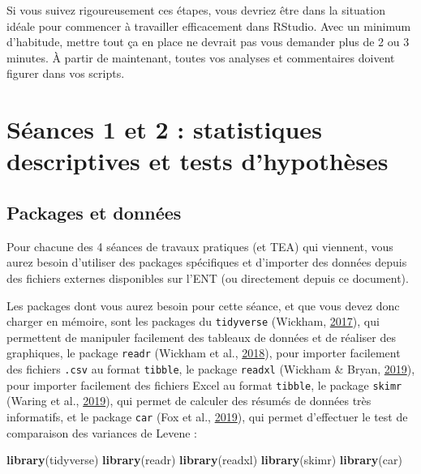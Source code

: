 \documentclass[a4paperpaper,]{article}
\newenvironment{Shaded}{\begin{snugshade}}{\end{snugshade}}
\newcommand{\KeywordTok}[1]{\textcolor[rgb]{0.12,0.11,0.11}{\textbf{#1}}}
\newcommand{\NormalTok}[1]{\textcolor[rgb]{0.12,0.11,0.11}{#1}}
\begin{document}
Si vous suivez rigoureusement ces étapes, vous devriez être dans la situation idéale pour commencer à travailler efficacement dans RStudio. Avec un minimum d'habitude, mettre tout ça en place ne devrait pas vous demander plus de 2 ou 3 minutes. À partir de maintenant, toutes vos analyses et commentaires doivent figurer dans vos scripts.

\hypertarget{seance1}{%
\section{Séances 1 et 2 : statistiques descriptives et tests d'hypothèses}\label{seance1}}

\hypertarget{packages}{%
\subsection{Packages et données}\label{packages}}

Pour chacune des 4 séances de travaux pratiques (et TEA) qui viennent, vous aurez besoin d'utiliser des packages spécifiques et d'importer des données depuis des fichiers externes disponibles sur l'ENT (ou directement depuis ce document).

Les packages dont vous aurez besoin pour cette séance, et que vous devez donc charger en mémoire, sont les packages du \texttt{tidyverse} (Wickham, \protect\hyperlink{ref-R-tidyverse}{2017}), qui permettent de manipuler facilement des tableaux de données et de réaliser des graphiques, le package \texttt{readr} (Wickham et al., \protect\hyperlink{ref-R-readr}{2018}), pour importer facilement des fichiers \texttt{.csv} au format \texttt{tibble}, le package \texttt{readxl} (Wickham \& Bryan, \protect\hyperlink{ref-R-readxl}{2019}), pour importer facilement des fichiers Excel au format \texttt{tibble}, le package \texttt{skimr} (Waring et al., \protect\hyperlink{ref-R-skimr}{2019}), qui permet de calculer des résumés de données très informatifs, et le package \texttt{car} (Fox et al., \protect\hyperlink{ref-R-car}{2019}), qui permet d'effectuer le test de comparaison des variances de Levene :

\begin{Shaded}
\begin{Highlighting}[]
\KeywordTok{library}\NormalTok{(tidyverse)}
\KeywordTok{library}\NormalTok{(readr)}
\KeywordTok{library}\NormalTok{(readxl)}
\KeywordTok{library}\NormalTok{(skimr)}
\KeywordTok{library}\NormalTok{(car)}
\end{Highlighting}
\end{Shaded}
\end{document}
